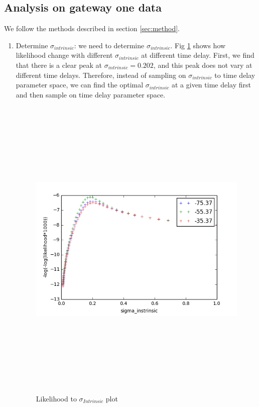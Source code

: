 \documentclass[\docopts]{\docclass}
\begin{document}
\subsection{Analysis on gateway one data}
We follow the methods described in section \ref{sec:method}. 
\begin{enumerate}
\item Determine $\sigma_{intrinsic}$: we need to determine $\sigma_{intrinsic}$. Fig \ref{fig:sigma1} shows how likelihood change with different $\sigma_{intrinsic}$ at different time delay. First, we find that there is a clear peak at $\sigma_{intrinsic}=0.202$, and this peak does not vary at different time delays. 
Therefore, instead of sampling on $\sigma_{intrinsic}$ to time delay parameter space, we can find the optimal $\sigma_{intrinsic}$ at a given time delay first and then sample on time delay parameter space. 
\begin{figure}[!h]
\includegraphics[width=\textwidth, height=15cm, keepaspectratio]{sigma_0.png}
\caption{Likelihood to $\sigma_{Intrinsic}$ plot}
\label{fig:sigma1}
\end{figure}


\end{enumerate}
\end{document}
